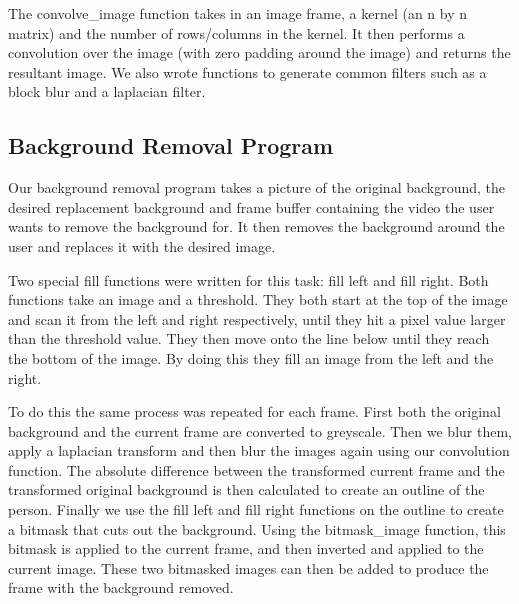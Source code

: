 \documentclass[11pt]{article}
\begin{document}
%
The convolve\_image function takes in an image frame, a kernel (an n by n matrix) and the number of rows/columns in the kernel. It then performs a convolution over the image (with zero padding around the image) and returns the resultant image. We also wrote functions to generate common filters such as a block blur and a laplacian filter.

  \subsection*{Background Removal Program}
Our background removal program takes a picture of the original background, the desired replacement background and frame buffer containing the video the user wants to remove the background for. It then removes the background around the user and replaces it with the desired image. 

%
Two special fill functions were written for this task: fill left and fill right. Both functions take an image and a threshold. They both start at the top of the image and scan it from the left and right respectively, until they hit a pixel value larger than the threshold value. They then move onto the line below until they reach the bottom of the image. By doing this they fill an image from the left and the right.

%
To do this the same process was repeated for each frame. First both the original background and the current frame are converted to greyscale. Then we blur them, apply a laplacian transform and then blur the images again using our convolution function. The absolute difference between the transformed current frame and the transformed original background is then calculated to create an outline of the person. Finally we use the fill left and fill right functions on the outline to create a bitmask that cuts out the background. Using the bitmask\_image function, this bitmask is applied to the current frame, and then inverted and applied to the current image. These two bitmasked images can then be added to produce the frame with the background removed. 
\end{document}
